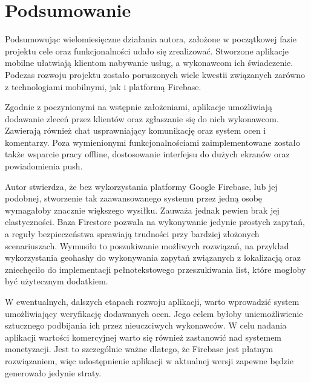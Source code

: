 \chapter{Podsumowanie}

Podsumowując wielomiesięczne działania autora, założone w początkowej fazie projektu cele oraz funkcjonalności udało się zrealizować. Stworzone aplikacje mobilne ułatwiają klientom nabywanie usług, a wykonawcom ich świadczenie. Podczas rozwoju projektu zostało poruszonych wiele kwestii związanych zarówno z technologiami mobilnymi, jak i platformą Firebase.

Zgodnie z poczynionymi na wstępnie założeniami, aplikacje umożliwiają dodawanie zleceń przez klientów oraz zgłaszanie się do nich wykonawcom. Zawierają również chat usprawniający komunikację oraz system ocen i komentarzy. Poza wymienionymi funkcjonalnościami zaimplementowane zostało także wsparcie pracy offline, dostosowanie interfejsu do dużych ekranów oraz powiadomienia push.

Autor stwierdza, że bez wykorzystania platformy Google Firebase, lub jej podobnej, stworzenie tak zaawansowanego systemu przez jedną osobę wymagałoby znacznie większego wysiłku. Zauważa jednak pewien brak jej elastyczności. Baza Firestore pozwala na wykonywanie jedynie prostych zapytań, a reguły bezpieczeństwa sprawiają trudności przy bardziej złożonych scenariuszach. Wymusiło to poszukiwanie możliwych rozwiązań, na przykład wykorzystania geohashy do wykonywania zapytań związanych z lokalizacją oraz zniechęciło do implementacji pełnotekstowego przeszukiwania list, które mogłoby być użytecznym dodatkiem.


W ewentualnych, dalszych etapach rozwoju aplikacji, warto wprowadzić system umożliwiający weryfikację dodawanych ocen. Jego celem byłoby uniemożliwienie sztucznego podbijania ich przez nieuczciwych wykonawców. W celu nadania aplikacji wartości komercyjnej warto się również zastanowić nad systemem monetyzacji. Jest to szczególnie ważne dlatego, że Firebase jest płatnym rozwiązaniem, więc udostępnienie aplikacji w aktualnej wersji zapewne będzie generowało jedynie straty. 

